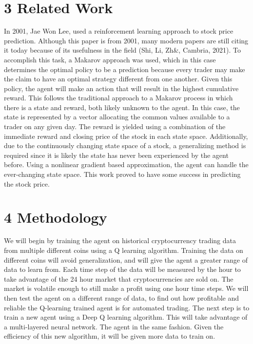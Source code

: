 \documentclass[letterpaper]{article}
\begin{document}
\section{3 Related Work}
In 2001, Jae Won Lee, used a reinforcement learning approach to stock price prediction. Although this paper is from 2001, many modern papers are still citing it today because of its usefulness in the field (Shi, Li, Zh\&, Cambria, 2021). To accomplish this task, a Makarov approach was used, which in this case determines the optimal policy to be a prediction because every trader may make the claim to have an optimal strategy different from one another. Given this policy, the agent will make an action that will result in the highest cumulative reward. This follows the traditional approach to a Makarov process in which there is a state and reward, both likely unknown to the agent. In this case, the state is represented by a vector allocating the common values available to a trader on any given day. The reward is yielded using a combination of the immediate reward and closing price of the stock in each state space. Additionally, due to the continuously changing state space of a stock, a generalizing method is required since it is likely the state has never been experienced by the agent before. Using a nonlinear gradient based approximation, the agent can handle the ever-changing state space. This work proved to have some success in predicting the stock price.

\section{4 Methodology}
We will begin by training the agent on historical cryptocurrency trading data from multiple different coins using a Q learning algorithm. Training the data on different coins will avoid generalization, and will give the agent a greater range of data to learn from. Each time step of the data will be measured by the hour to take advantage of the 24 hour market that cryptocurrencies are sold on. The market is volatile enough to still make a profit using one hour time steps. We will then test the agent on a different range of data, to find out how profitable and reliable the Q-learning trained agent is for automated trading. The next step is to train a new agent using a Deep Q learning algorithm. This will take advantage of a multi-layered neural network. The agent in the same fashion. Given the efficiency of this new algorithm, it will be given more data to train on.
\end{document}
